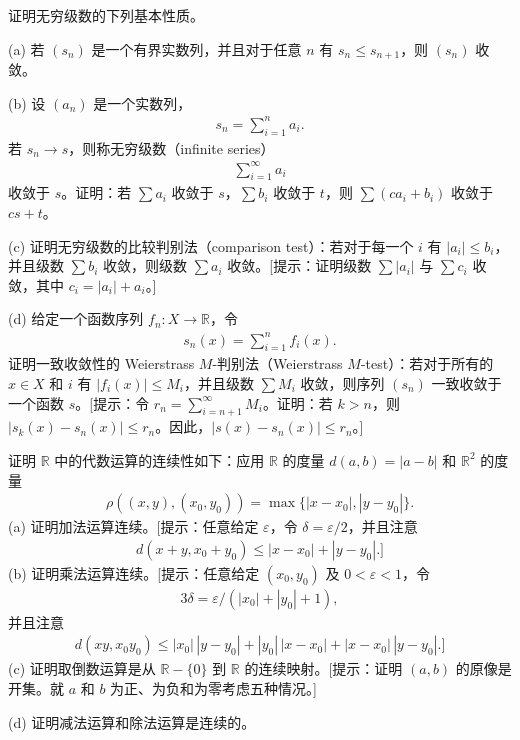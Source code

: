 \documentclass[../../main.tex]{subfiles}
\begin{document}
\begin{exercise}\label{exercise:ch02-度量拓扑续-11}
证明无穷级数的下列基本性质。

(a) 若 $(s_{n})$ 是一个有界实数列，并且对于任意 $n$ 有 $s_{n} \leqslant s_{n+1}$，则 $(s_{n})$ 收敛。

(b) 设 $(a_{n})$ 是一个实数列，
\begin{align*}
s_{n} = \sum_{i=1}^{n} a_{i}.
\end{align*}
若 $s_{n} \rightarrow s$，则称无穷级数（infinite series）
\begin{align*}
\sum_{i=1}^{\infty} a_{i}
\end{align*}
收敛于 $s$。证明：若 $\sum a_{i}$ 收敛于 $s$，$\sum b_{i}$ 收敛于 $t$，则 $\sum (ca_{i} + b_{i})$ 收敛于 $cs + t$。

(c) 证明无穷级数的比较判别法（comparison test）：若对于每一个 $i$ 有 $|a_{i}| \leqslant b_{i}$，并且级数 $\sum b_{i}$ 收敛，则级数 $\sum a_{i}$ 收敛。[提示：证明级数 $\sum |a_{i}|$ 与 $\sum c_{i}$ 收敛，其中 $c_{i} = |a_{i}| + a_{i}$。]

(d) 给定一个函数序列 $f_{n}: X \rightarrow \mathbb{R}$，令
\begin{align*}
s_{n}(x) = \sum_{i=1}^{n} f_{i}(x).
\end{align*}
证明一致收敛性的 Weierstrass $M$-判别法（Weierstrass $M$-test）：若对于所有的 $x \in X$ 和 $i$ 有 $|f_{i}(x)| \leqslant M_{i}$，并且级数 $\sum M_{i}$ 收敛，则序列 $(s_{n})$ 一致收敛于一个函数 $s$。[提示：令 $r_{n} = \sum_{i=n+1}^{\infty} M_{i}$。证明：若 $k > n$，则 $|s_{k}(x) - s_{n}(x)| \leqslant r_{n}$。因此，$|s(x) - s_{n}(x)| \leqslant r_{n}$。]
\end{exercise}

\begin{exercise}\label{exercise:ch02-度量拓扑续-12}
证明 $\mathbb{R}$ 中的代数运算的连续性如下：应用 $\mathbb{R}$ 的度量 $d(a, b) = |a - b|$ 和 $\mathbb{R}^{2}$ 的度量
\begin{align*}
\rho((x, y), (x_{0}, y_{0})) = \max \{|x - x_{0}|, |y - y_{0}|\}.
\end{align*}
(a) 证明加法运算连续。[提示：任意给定 $\varepsilon$，令 $\delta = \varepsilon/2$，并且注意
\begin{align*}
d(x + y, x_{0} + y_{0}) \leqslant |x - x_{0}| + |y - y_{0}|.]
\end{align*}
(b) 证明乘法运算连续。[提示：任意给定 $(x_{0}, y_{0})$ 及 $0 < \varepsilon < 1$，令
\begin{align*}
3\delta = \varepsilon/(|x_{0}| + |y_{0}| + 1),
\end{align*}
并且注意
\begin{align*}
d(xy, x_{0}y_{0}) \leqslant |x_{0}|\, |y - y_{0}| + |y_{0}|\, |x - x_{0}| + |x - x_{0}|\, |y - y_{0}|.]
\end{align*}
(c) 证明取倒数运算是从 $\mathbb{R} - \{0\}$ 到 $\mathbb{R}$ 的连续映射。[提示：证明 $(a, b)$ 的原像是开集。就 $a$ 和 $b$ 为正、为负和为零考虑五种情况。]

(d) 证明减法运算和除法运算是连续的。
\end{exercise}
\end{document}
